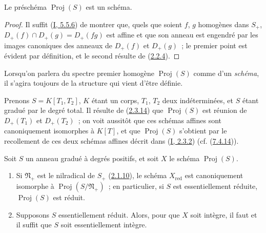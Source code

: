 \begin{proposition}[2.4.2]
\label{II.2.4.2-fr}
Le préschéma $\operatorname{Proj}(S)$ est un schéma.
\end{proposition}

\begin{proof}
Il suffit (\hyperref[I.5.5.6-fr]{I, 5.5.6}) de montrer que, quels que soient
$f$, $g$ homogènes dans $S_+$,
$D_+(f)\cap D_+(g)=D_+(fg)$ est affine et que son anneau est engendré par
les images canoniques des anneaux de $D_+(f)$ et $D_+(g)$~; le premier
point est évident par définition, et le second résulte de
(\hyperref[II.2.2.4-fr]{2.2.4}).
\end{proof}
Lorsqu'on parlera du spectre premier homogène $\operatorname{Proj}(S)$ comme
d'un \emph{schéma}, il s'agira toujours de la structure qui vient d'être
définie.

\begin{example}[2.4.3]
\label{II.2.4.3-fr}
Prenons $S=K[T_1,T_2]$, $K$ étant un corps, $T_1$, $T_2$ deux
indéterminées, et $S$ étant gradué par le degré total. Il résulte de
(\hyperref[II.2.3.14-fr]{2.3.14}) que $\operatorname{Proj}(S)$ est réunion
de $D_+(T_1)$ et $D_+(T_2)$~; on voit aussitôt que ces schémas affines sont
canoniquement isomorphes à $K[T]$, et que $\operatorname{Proj}(S)$
s'obtient par le recollement de ces deux schémas affines décrit dans
(\hyperref[I.2.3.2-fr]{I, 2.3.2}) (cf.
(\hyperref[II.7.4.14-fr]{7.4.14})).
\end{example}

\begin{proposition}[2.4.4]
\label{II.2.4.4-fr}
Soit $S$ un anneau gradué à degrés positifs, et soit $X$ le schéma
$\operatorname{Proj}(S)$.
\begin{enumerate}
  \item[\rm(i)] Si $\mathfrak{N}_+$ est le nilradical de $S_+$
    (\hyperref[II.2.1.10-fr]{2.1.10}), le schéma $X_{\mathrm{red}}$ est
    canoniquement isomorphe à $\operatorname{Proj}(S/\mathfrak{N}_+)$~; en
    particulier, si $S$ est essentiellement réduite,
    $\operatorname{Proj}(S)$ est réduit.
  \item[\rm(ii)] Supposons $S$ essentiellement réduit. Alors, pour que $X$
    soit intègre, il faut et il suffit que $S$ soit essentiellement intègre.
\end{enumerate}
\end{proposition}

